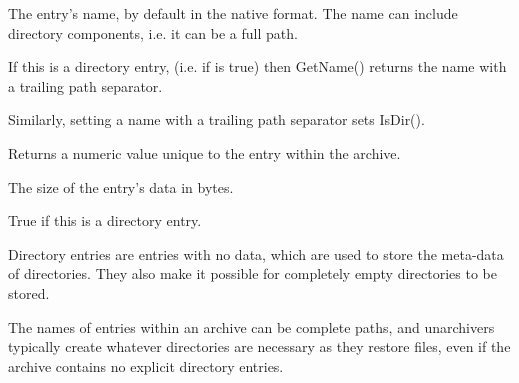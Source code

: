 \label{wxarchiveentryname}



The entry's name, by default in the native format. The name can include
directory components, i.e. it can be a full path.

If this is a directory entry, (i.e. if 
is true) then GetName() returns the name with a trailing path separator.

Similarly, setting a name with a trailing path separator sets IsDir().


\label{wxarchiveentrygetoffset}


Returns a numeric value unique to the entry within the archive.


\label{wxarchiveentrysize}



The size of the entry's data in bytes.


\label{wxarchiveentryisdir}



True if this is a directory entry.

Directory entries are entries with no data, which are used to store
the meta-data of directories. They also make it possible for completely
empty directories to be stored.

The names of entries within an archive can be complete paths, and
unarchivers typically create whatever directories are necessary as they
restore files, even if the archive contains no explicit directory entries.


\label{wxarchiveentryisreadonly}



